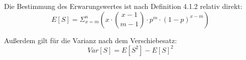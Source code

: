Die Bestimmung des Erwarungswertes ist nach Definition 4.1.2 relativ direkt:
\[ E[S] = \Sigma_{x = m} ^{n} ( x \cdot {x-1 \choose m-1} \cdot p ^m \cdot (1-p) ^{x-m} ) \]

Außerdem gilt für die Varianz nach dem Verschiebesatz:
\[ Var[S] = E[S^2] - E[S]^2 \]


